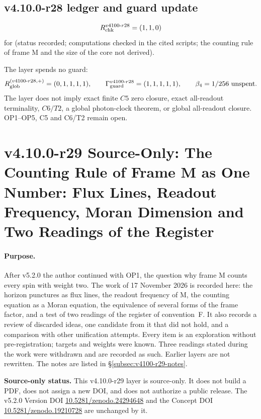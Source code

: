 \subsection*{v4.10.0-r28 ledger and guard update}
\label{subsec:v4100-r28-ledger-guard}

\[
R_{\rm chk}^{v4100\text{-}r28}=(1,1,0)
\]
for (status recorded; computations checked in the cited scripts; the counting rule of frame M and the size of the core not derived).

The layer spends no guard:
\[
R_{\rm glob}^{(v4100\text{-}r28,+)}=(0,1,1,1,1),
\qquad
\Gamma_{\rm guard}^{v4100\text{-}r28}=(1,1,1,1,1),
\qquad
\beta_4=1/256\ \text{unspent}.
\]
The layer does not imply exact finite \(C5\) zero closure, exact all-readout terminality, \(C6/T2\), a global photon-clock theorem,
or global all-readout closure.  OP1--OP5, C5 and C6/T2 remain open.

\clearpage
\section*{v4.10.0-r29 Source-Only: The Counting Rule of Frame M as One Number: Flux Lines, Readout Frequency, Moran Dimension and Two Readings of the Register}
\label{sec:v4100-r29-one-number}

\paragraph{Purpose.}
After v5.2.0 the author continued with OP1, the question why frame M counts every spin with weight two.  The work of 17 November 2026 is recorded here:
the horizon punctures as flux lines, the readout frequency of M, the counting equation as a Moran equation, the equivalence of several forms of the
frame factor, and a test of two readings of the register of convention~F.  It also records a review of discarded ideas, one candidate from it that
did not hold, and a comparison with other unification attempts.  Every item is an exploration without pre-registration; targets and weights were
known.  Three readings stated during the work were withdrawn and are recorded as such.  Earlier layers are not rewritten.  The notes are listed in
\S\ref{subsec:v4100-r29-notes}.

\noindent\textbf{Source-only status.}
This v4.10.0-r29 layer is source-only.  It does not build a PDF, does not assign a new DOI,
and does not authorize a public release.  The v5.2.0 Version DOI
\href{https://doi.org/10.5281/zenodo.24294648}{10.5281/zenodo.24294648} and the Concept DOI
\href{https://doi.org/10.5281/zenodo.19210728}{10.5281/zenodo.19210728} are unchanged by it.

